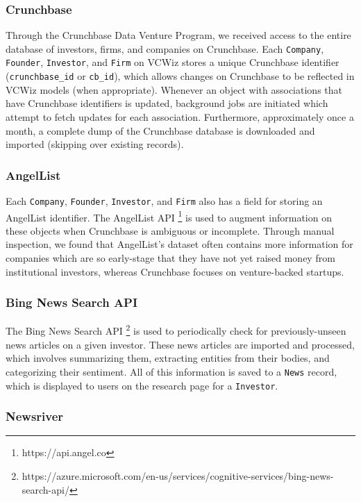 \subsubsection{Crunchbase}

Through the Crunchbase Data Venture Program, we received access to the entire database of investors, firms, and companies on Crunchbase. Each \texttt{Company}, \texttt{Founder}, \texttt{Investor}, and \texttt{Firm} on VCWiz stores a unique Crunchbase identifier (\texttt{crunchbase\_id} or \texttt{cb\_id}), which allows changes on Crunchbase to be reflected in VCWiz models (when appropriate). Whenever an object with associations that have Crunchbase identifiers is updated, background jobs are initiated which attempt to fetch updates for each association. Furthermore, approximately once a month, a complete dump of the Crunchbase database is downloaded and imported (skipping over existing records).

\subsubsection{AngelList}

Each \texttt{Company}, \texttt{Founder}, \texttt{Investor}, and \texttt{Firm} also has a field for storing an AngelList identifier. The AngelList API \footnote{https://api.angel.co} is used to augment information on these objects when Crunchbase is ambiguous or incomplete. Through manual inspection, we found that AngelList's dataset often contains more information for companies which are so early-stage that they have not yet raised money from institutional investors, whereas Crunchbase focuses on venture-backed startups.

\subsubsection{Bing News Search API}

The Bing News Search API \footnote{https://azure.microsoft.com/en-us/services/cognitive-services/bing-news-search-api/} is used to periodically check for previously-unseen news articles on a given investor. These news articles are imported and processed, which involves summarizing them, extracting entities from their bodies, and categorizing their sentiment. All of this information is saved to a \texttt{News} record, which is displayed to users on the research page for a \texttt{Investor}.

\subsubsection{Newsriver}

